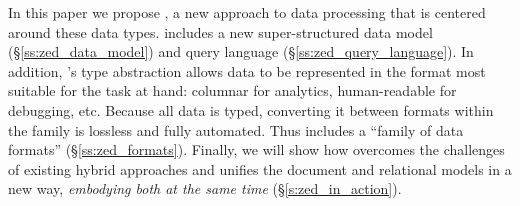 In this paper we propose {\bf \sys{}}, a new approach to data processing that is centered around these data types. \sys{} includes a new super-structured data model (\S\ref{ss:zed_data_model}) and query language (\S\ref{ss:zed_query_language}). In addition, \sys{}'s type abstraction allows data to be represented in the format most suitable for the task at hand: columnar for analytics, human-readable for debugging, etc.  Because all data is typed, converting it between formats within the family is lossless and fully automated. Thus \sys{} includes a ``family of data formats'' (\S\ref{ss:zed_formats}). Finally, we will show how \sys{} overcomes the challenges of existing hybrid approaches and unifies the document and relational models in a new way, {\em embodying both at the same time}  (\S\ref{s:zed_in_action}). %
